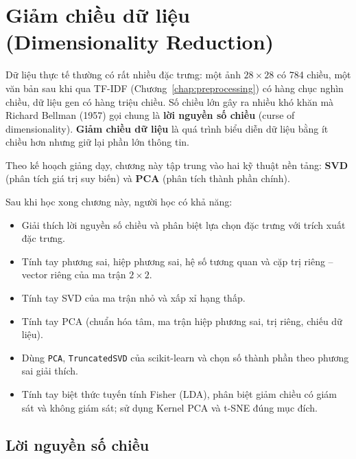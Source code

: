 
\chapter{Giảm chiều dữ liệu \\ (Dimensionality Reduction)}
\label{chap:reduce-dimension}

Dữ liệu thực tế thường có rất nhiều đặc trưng: một ảnh $28 \times 28$ có 784 chiều, một văn bản sau khi qua TF-IDF (Chương~\ref{chap:preprocessing}) có hàng chục nghìn chiều, dữ liệu gen có hàng triệu chiều. Số chiều lớn gây ra nhiều khó khăn mà Richard Bellman (1957) gọi chung là \textbf{lời nguyền số chiều} (curse of dimensionality). \textbf{Giảm chiều dữ liệu} là quá trình biểu diễn dữ liệu bằng ít chiều hơn nhưng giữ lại phần lớn thông tin.

Theo kế hoạch giảng dạy, chương này tập trung vào hai kỹ thuật nền tảng: \textbf{SVD} (phân tích giá trị suy biến) và \textbf{PCA} (phân tích thành phần chính).

\noindent Sau khi học xong chương này, người học có khả năng:
\begin{itemize}
    \item Giải thích lời nguyền số chiều và phân biệt lựa chọn đặc trưng với trích xuất đặc trưng.
    \item Tính tay phương sai, hiệp phương sai, hệ số tương quan và cặp trị riêng -- vector riêng của ma trận $2 \times 2$.
    \item Tính tay SVD của ma trận nhỏ và xấp xỉ hạng thấp.
    \item Tính tay PCA (chuẩn hóa tâm, ma trận hiệp phương sai, trị riêng, chiếu dữ liệu).
    \item Dùng \texttt{PCA}, \texttt{TruncatedSVD} của scikit-learn và chọn số thành phần theo phương sai giải thích.
    \item Tính tay biệt thức tuyến tính Fisher (LDA), phân biệt giảm chiều có giám sát và không giám sát; sử dụng Kernel PCA và t-SNE đúng mục đích.
\end{itemize}

\section{Lời nguyền số chiều}

